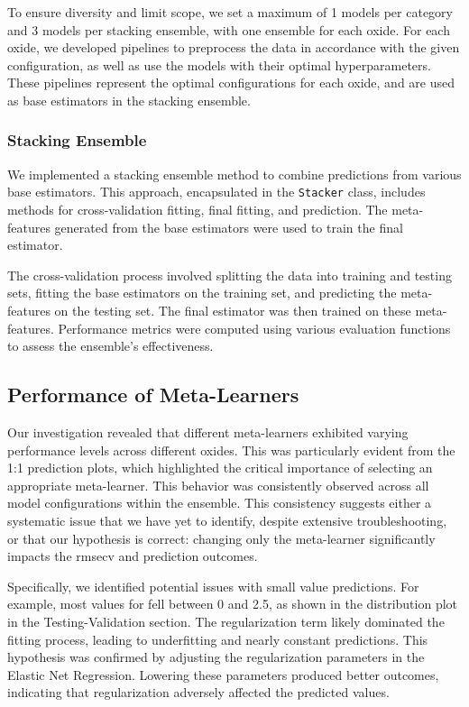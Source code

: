 To ensure diversity and limit scope, we set a maximum of 1 models per category and 3 models per stacking ensemble, with one ensemble for each oxide.
For each oxide, we developed pipelines to preprocess the data in accordance with the given configuration, as well as use the models with their optimal hyperparameters.
These pipelines represent the optimal configurations for each oxide, and are used as base estimators in the stacking ensemble.

\subsubsection{Stacking Ensemble}

We implemented a stacking ensemble method to combine predictions from various base estimators.
This approach, encapsulated in the \texttt{Stacker} class, includes methods for cross-validation fitting, final fitting, and prediction.
The meta-features generated from the base estimators were used to train the final estimator.

The cross-validation process involved splitting the data into training and testing sets, fitting the base estimators on the training set, and predicting the meta-features on the testing set.
The final estimator was then trained on these meta-features.
Performance metrics were computed using various evaluation functions to assess the ensemble's effectiveness.

\subsection{Performance of Meta-Learners}

Our investigation revealed that different meta-learners exhibited varying performance levels across different oxides.
This was particularly evident from the 1:1 prediction plots, which highlighted the critical importance of selecting an appropriate meta-learner.
This behavior was consistently observed across all model configurations within the ensemble.
This consistency suggests either a systematic issue that we have yet to identify, despite extensive troubleshooting, or that our hypothesis is correct: changing only the meta-learner significantly impacts the \gls{rmsecv} and prediction outcomes.

Specifically, we identified potential issues with small value predictions.
For example, most values for  fell between 0 and 2.5, as shown in the distribution plot in the Testing-Validation section.
The regularization term likely dominated the fitting process, leading to underfitting and nearly constant predictions.
This hypothesis was confirmed by adjusting the regularization parameters in the Elastic Net Regression.
Lowering these parameters produced better outcomes, indicating that regularization adversely affected the predicted values.


